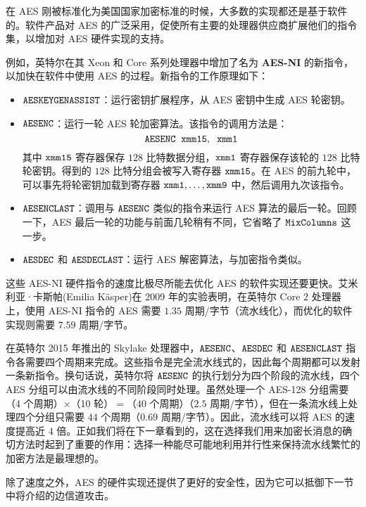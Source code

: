\begin{snote}[AES的硬件实现。]
在 AES 刚被标准化为美国国家加密标准的时候，大多数的实现都还是基于软件的。软件产品对 AES 的广泛采用，促使所有主要的处理器供应商扩展他们的指令集，以增加对 AES 硬件实现的支持。

例如，英特尔在其 Xeon 和 Core 系列处理器中增加了名为 \textbf{AES-NI} 的新指令，以加快在软件中使用 AES 的过程。新指令的工作原理如下：
\begin{itemize}
	\item $\tt{AESKEYGENASSIST}$：运行密钥扩展程序，从 AES 密钥中生成 AES 轮密钥。
	\item $\tt{AESENC}$：运行一轮 AES 轮加密算法。该指令的调用方法是：
	\[
    \tt{AESENC\;\;xmm15,\;\;xmm1}
    \]
    其中 $\tt xmm15$ 寄存器保存 $128$ 比特数据分组，$\tt xmm1$ 寄存器保存该轮的 $128$ 比特轮密钥。得到的 $128$ 比特分组会被写入寄存器 $\tt xmm15$。在 AES 的前九轮中，可以事先将轮密钥加载到寄存器 $\tt{xmm1,\dots,xmm9}$ 中，然后调用九次该指令。
    \item $\tt AESENCLAST$：调用与 $\tt AESENC$ 类似的指令来运行 AES 算法的最后一轮。回顾一下，AES 最后一轮的功能与前面几轮稍有不同，它省略了 $\tt MixColumns$ 这一步。
    \item $\tt AESDEC$ 和 $\tt AESDECLAST$：运行 AES 解密算法，与加密指令类似。
\end{itemize}
这些 AES-NI 硬件指令的速度比极尽所能去优化 AES 的软件实现还要更快。艾米利亚·卡斯帕(Emilia Käsper)在 2009 年的实验表明，在英特尔 Core 2 处理器上，使用 AES-NI 指令的 AES 需要 $1.35$ 周期/字节（流水线化），而优化的软件实现则需要 $7.59$ 周期/字节。

在英特尔 2015 年推出的 Skylake 处理器中，$\tt AESENC$、$\tt AESDEC$ 和 $\tt AESENCLAST$ 指令各需要四个周期来完成。这些指令是完全流水线式的，因此每个周期都可以发射一条新指令。换句话说，英特尔将 $\tt AESENC$ 的执行划分为四个阶段的流水线，四个 AES 分组可以由流水线的不同阶段同时处理。虽然处理一个 AES-128 分组需要（4 个周期）$\times$（10 轮）$=$（$40$ 个周期）（$2.5$ 周期/字节），但在一条流水线上处理四个分组只需要 $44$ 个周期（$0.69$ 周期/字节）。因此，流水线可以将 AES 的速度提高近 $4$ 倍。正如我们将在下一章看到的，这在选择我们用来加密长消息的确切方法时起到了重要的作用：选择一种能尽可能地利用并行性来保持流水线繁忙的加密方法是最理想的。

除了速度之外，AES 的硬件实现还提供了更好的安全性，因为它可以抵御下一节中将介绍的边信道攻击。
\end{snote}